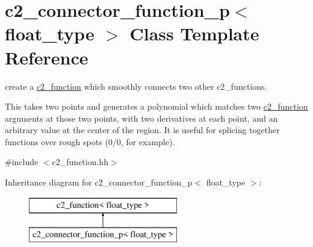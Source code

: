 \hypertarget{classc2__connector__function__p}{\section{c2\-\_\-connector\-\_\-function\-\_\-p$<$ float\-\_\-type $>$ Class Template Reference}
\label{classc2__connector__function__p}
}


create a \hyperlink{classc2__function}{c2\-\_\-function} which smoothly connects two other c2\-\_\-functions.

This takes two points and generates a polynomial which matches two \hyperlink{classc2__function}{c2\-\_\-function} arguments at those two points, with two derivatives at each point, and an arbitrary value at the center of the region. It is useful for splicing together functions over rough spots (0/0, for example).  




{\ttfamily \#include $<$c2\-\_\-function.\-hh$>$}

Inheritance diagram for c2\-\_\-connector\-\_\-function\-\_\-p$<$ float\-\_\-type $>$\-:\begin{figure}[H]
\begin{center}
\leavevmode
\includegraphics[height=2.000000cm]{classc2__connector__function__p}
\end{center}
\end{figure}
